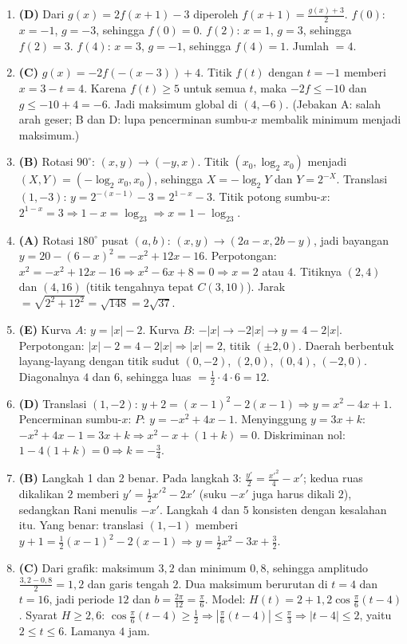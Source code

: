 \documentclass[a4paper,11pt]{article}
\newcounter{no}
\begin{document}
\begin{enumerate}[leftmargin=2em,itemsep=2pt,topsep=2pt]
\item[\textbf{10.}] \textbf{(D)} Dari $g(x)=2f(x+1)-3$ diperoleh $f(x+1)=\frac{g(x)+3}2$. $f(0)$: $x=-1$, $g=-3$, sehingga $f(0)=0$. $f(2)$: $x=1$, $g=3$, sehingga $f(2)=3$. $f(4)$: $x=3$, $g=-1$, sehingga $f(4)=1$. Jumlah $=4$.
\item[\textbf{11.}] \textbf{(C)} $g(x)=-2f(-(x-3))+4$. Titik $f(t)$ dengan $t=-1$ memberi $x=3-t=4$. Karena $f(t)\ge5$ untuk semua $t$, maka $-2f\le-10$ dan $g\le-10+4=-6$. Jadi maksimum global di $(4,-6)$. (Jebakan A: salah arah geser; B dan D: lupa pencerminan sumbu-$x$ membalik minimum menjadi maksimum.)
\item[\textbf{12.}] \textbf{(B)} Rotasi $90^\circ$: $(x,y)\to(-y,x)$. Titik $(x_0,\log_2x_0)$ menjadi $(X,Y)=(-\log_2x_0,x_0)$, sehingga $X=-\log_2Y$ dan $Y=2^{-X}$. Translasi $(1,-3)$: $y=2^{-(x-1)}-3=2^{1-x}-3$. Titik potong sumbu-$x$: $2^{1-x}=3\Rightarrow1-x=\log_23\Rightarrow x=1-\log_23$.
\item[\textbf{13.}] \textbf{(A)} Rotasi $180^\circ$ pusat $(a,b)$: $(x,y)\to(2a-x,2b-y)$, jadi bayangan $y=20-(6-x)^2=-x^2+12x-16$. Perpotongan: $x^2=-x^2+12x-16\Rightarrow x^2-6x+8=0\Rightarrow x=2$ atau $4$. Titiknya $(2,4)$ dan $(4,16)$ (titik tengahnya tepat $C(3,10)$). Jarak $=\sqrt{2^2+12^2}=\sqrt{148}=2\sqrt{37}$.
\item[\textbf{14.}] \textbf{(E)} Kurva $A$: $y=|x|-2$. Kurva $B$: $-|x|\to-2|x|\to y=4-2|x|$. Perpotongan: $|x|-2=4-2|x|\Rightarrow|x|=2$, titik $(\pm2,0)$. Daerah berbentuk layang-layang dengan titik sudut $(0,-2)$, $(2,0)$, $(0,4)$, $(-2,0)$. Diagonalnya $4$ dan $6$, sehingga luas $=\frac12\cdot4\cdot6=12$.
\item[\textbf{15.}] \textbf{(D)} Translasi $(1,-2)$: $y+2=(x-1)^2-2(x-1)\Rightarrow y=x^2-4x+1$. Pencerminan sumbu-$x$: $P:\ y=-x^2+4x-1$. Menyinggung $y=3x+k$: $-x^2+4x-1=3x+k\Rightarrow x^2-x+(1+k)=0$. Diskriminan nol: $1-4(1+k)=0\Rightarrow k=-\frac34$.
\item[\textbf{16.}] \textbf{(B)} Langkah 1 dan 2 benar. Pada langkah 3: $\frac{y'}2=\frac{x'^2}4-x'$; kedua ruas dikalikan $2$ memberi $y'=\frac12x'^2-2x'$ (suku $-x'$ juga harus dikali $2$), sedangkan Rani menulis $-x'$. Langkah 4 dan 5 konsisten dengan kesalahan itu. Yang benar: translasi $(1,-1)$ memberi $y+1=\frac12(x-1)^2-2(x-1)\Rightarrow y=\frac12x^2-3x+\frac32$.
\item[\textbf{17.}] \textbf{(C)} Dari grafik: maksimum $3{,}2$ dan minimum $0{,}8$, sehingga amplitudo $\frac{3{,}2-0{,}8}2=1{,}2$ dan garis tengah $2$. Dua maksimum berurutan di $t=4$ dan $t=16$, jadi periode $12$ dan $b=\frac{2\pi}{12}=\frac\pi6$. Model: $H(t)=2+1{,}2\cos\frac\pi6(t-4)$. Syarat $H\ge2{,}6$: $\cos\frac\pi6(t-4)\ge\frac12\Rightarrow\left|\frac\pi6(t-4)\right|\le\frac\pi3\Rightarrow|t-4|\le2$, yaitu $2\le t\le6$. Lamanya $4$ jam.

\end{enumerate}
\end{document}
